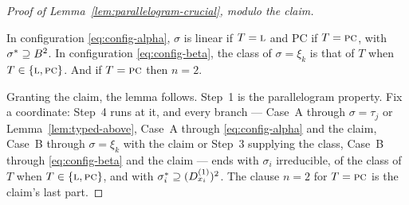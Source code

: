 \begin{proof}[Proof of Lemma~\ref{lem:parallelogram-crucial}, modulo the claim]
\begin{claim}\label{cl:typing-anchor}
In configuration \eqref{eq:config-alpha}, $\sigma$ is linear if $T=\textup{\textsc{l}}$ and
PC if $T=\textup{\textsc{pc}}$, with $\sigma^{*}\supseteq B^{2}$. In configuration
\eqref{eq:config-beta}, the class of $\sigma=\xi_{k}$ is that of $T$ when
$T\in\{\textup{\textsc{l}},\textup{\textsc{pc}}\}$. And if $T=\textup{\textsc{pc}}$ then $n=2$.
\end{claim}

Granting the claim, the lemma follows. Step~1 is the parallelogram property.
Fix a coordinate: Step~4 runs at it, and every branch --- Case~A through
$\sigma=\tau_{j}$ or Lemma~\ref{lem:typed-above}, Case~A through
\eqref{eq:config-alpha} and the claim, Case~B through $\sigma=\xi_{k}$ with
the claim or Step~3 supplying the class, Case~B through
\eqref{eq:config-beta} and the claim --- ends with $\sigma_{i}$ irreducible,
of the class of $T$ when $T\in\{\textup{\textsc{l}},\textup{\textsc{pc}}\}$, and with
$\sigma_{i}^{*}\supseteq(D^{(1)}_{x_{i}})^{2}$. The clause $n=2$ for
$T=\textup{\textsc{pc}}$ is the claim's last part.
\end{proof}

